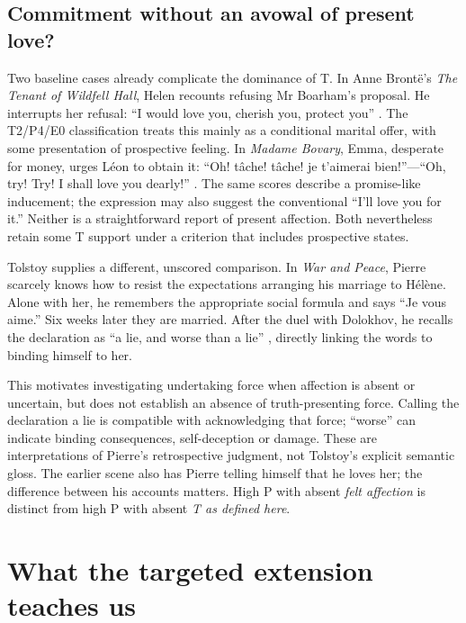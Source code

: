 \documentclass[11pt,a4paper]{article}
\begin{document}
\subsection{Commitment without an avowal of present love?}

Two baseline cases already complicate the dominance of T. In Anne Bront\"e's \emph{The Tenant of Wildfell Hall}, Helen recounts refusing Mr Boarham's proposal. He interrupts her refusal: “I would love you, cherish you, protect you” \citep[chap.~XVI]{bronteTenant}. The T2/P4/E0 classification treats this mainly as a conditional marital offer, with some presentation of prospective feeling. In \emph{Madame Bovary}, Emma, desperate for money, urges L\'eon to obtain it: “Oh! tâche! tâche! je t'aimerai bien!”---“Oh, try! Try! I shall love you dearly!” \citep[part~III, chap.~VII]{flaubertBovary}. The same scores describe a promise-like inducement; the expression may also suggest the conventional “I'll love you for it.” Neither is a straightforward report of present affection. Both nevertheless retain some T support under a criterion that includes prospective states.

Tolstoy supplies a different, unscored comparison. In \emph{War and Peace}, Pierre scarcely knows how to resist the expectations arranging his marriage to H\'el\`ene. Alone with her, he remembers the appropriate social formula and says “Je vous aime.” Six weeks later they are married. After the duel with Dolokhov, he recalls the declaration as “a lie, and worse than a lie” \citep[book~III, chap.~II; book~IV, chap.~VI]{tolstoyWarPeace}, directly linking the words to binding himself to her.

This motivates investigating undertaking force when affection is absent or uncertain, but does not establish an absence of truth-presenting force. Calling the declaration a lie is compatible with acknowledging that force; “worse” can indicate binding consequences, self-deception or damage. These are interpretations of Pierre's retrospective judgment, not Tolstoy's explicit semantic gloss. The earlier scene also has Pierre telling himself that he loves her; the difference between his accounts matters. High P with absent \emph{felt affection} is distinct from high P with absent \emph{T as defined here}.

\section{What the targeted extension teaches us}
\end{document}
